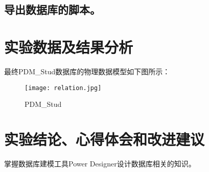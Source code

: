 \documentclass[a4paper]{uestcreport}
\begin{document}
\subsection{导出数据库的脚本。}

\section{实验数据及结果分析}
最终PDM\_Stud数据库的物理数据模型如下图所示：
\begin{figure}[!htbp]
    \centering
    \texttt{[image: relation.jpg]}
    \caption{PDM\_Stud}
\end{figure}

\section{实验结论、心得体会和改进建议}
掌握数据库建模工具Power Designer设计数据库相关的知识。
\end{document}
